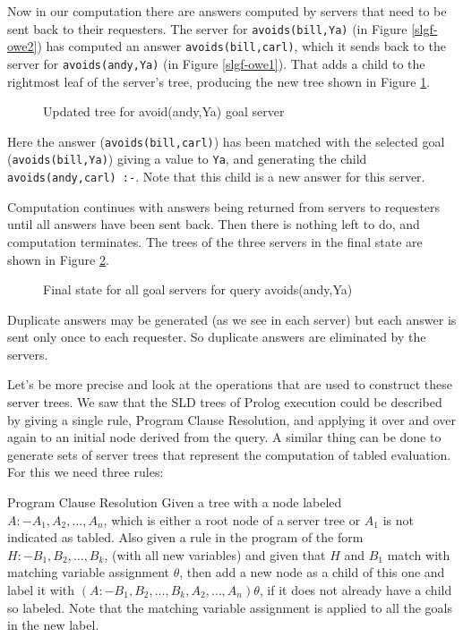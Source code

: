 Now in our computation there are answers computed by servers that need
to be sent back to their requesters.  The server for
\verb|avoids(bill,Ya)| (in Figure \ref{slgf-owe2}) has computed an 
answer \verb|avoids(bill,carl)|, which it sends back to the server for
\verb|avoids(andy,Ya)| (in Figure \ref{slgf-owe1}).  That adds a child
to the rightmost leaf of the server's tree, producing the new tree
shown in Figure \ref{slgf-owe4}.
\begin{figure}
\centerline{}
\caption{Updated tree for avoid(andy,Ya) goal server}\label{slgf-owe4}
\end{figure}
Here the answer (\verb|avoids(bill,carl)|) has been matched with the
selected goal (\verb|avoids(bill,Ya)|) giving a value to \verb|Ya|,
and generating the child \verb|avoids(andy,carl) :-|.  Note that this
child is a new answer for this server.

Computation continues with answers being returned from servers to
requesters until all answers have been sent back.  Then there is
nothing left to do, and computation terminates.  The trees of the
three servers in the final state are shown in Figure \ref{slgf-owe5}.
\begin{figure}
\centerline{}
\caption{Final state for all goal servers for query 
avoids(andy,Ya)}\label{slgf-owe5}
\end{figure}
Duplicate answers may be generated (as we see in each server) but each
answer is sent only once to each requester.  So duplicate answers are
eliminated by the servers.

Let's be more precise and look at the operations that are used to
construct these server trees.  We saw that the SLD trees of Prolog
execution could be described by giving a single rule, {\sc Program
Clause Resolution}, and applying it over and over again to an initial
node derived from the query.  A similar thing can be done to generate
sets of server trees that represent the computation of tabled
evaluation.  For this we need three rules:

\begin{definition} {Program Clause Resolution} \label{def:pcr}
Given a tree with a node labeled \\ $A :- A_1, A_2, \ldots, A_n$,
which is either a root node of a server tree or $A_1$ is not indicated
as tabled. Also given a rule in the program of the form $H :- B_1,
B_2, \ldots, B_k$, (with all new variables) and given that $H$ and
$B_1$ match with matching variable assignment $\theta$, then add a new
node as a child of this one and label it with $(A :- B_1, B_2, \ldots,
B_k, A_2, \ldots, A_n)\theta$, if it does not already have a child so
labeled.  Note that the matching variable assignment is applied to all
the goals in the new label.
\end{definition}

